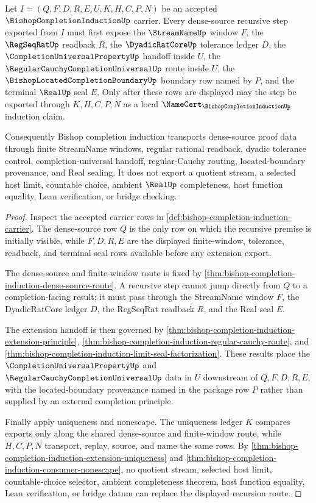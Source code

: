 \begin{theorem}
\label{thm:bishop-completion-induction-window-recursion}
Let $I=(Q,F,D,R,E,U,K,H,C,P,N)$ be an accepted $\BishopCompletionInductionUp$ carrier. Every dense-source recursive step exported from $I$ must first expose the $\StreamNameUp$ window $F$, the $\RegSeqRatUp$ readback $R$, the $\DyadicRatCoreUp$ tolerance ledger $D$, the $\CompletionUniversalPropertyUp$ handoff inside $U$, the $\RegularCauchyCompletionUniversalUp$ route inside $U$, the $\BishopLocatedCompletionBoundaryUp$ boundary row named by $P$, and the terminal $\RealUp$ seal $E$. Only after these rows are displayed may the step be exported through $K,H,C,P,N$ as a local $\NameCert_{\BishopCompletionInductionUp}$ induction claim.

Consequently Bishop completion induction transports dense-source proof data through finite StreamName windows, regular rational readback, dyadic tolerance control, completion-universal handoff, regular-Cauchy routing, located-boundary provenance, and Real sealing. It does not export a quotient stream, a selected host limit, countable choice, ambient $\RealUp$ completeness, host function equality, Lean verification, or bridge checking.
\end{theorem}
\begin{proof}
Inspect the accepted carrier rows in \autoref{def:bishop-completion-induction-carrier}. The dense-source row $Q$ is the only row on which the recursive premise is initially visible, while $F,D,R,E$ are the displayed finite-window, tolerance, readback, and terminal seal rows available before any extension export.

The dense-source and finite-window route is fixed by \autoref{thm:bishop-completion-induction-dense-source-route}. A recursive step cannot jump directly from $Q$ to a completion-facing result; it must pass through the StreamName window $F$, the DyadicRatCore ledger $D$, the RegSeqRat readback $R$, and the Real seal $E$.

The extension handoff is then governed by \autoref{thm:bishop-completion-induction-extension-principle}, \autoref{thm:bishop-completion-induction-regular-cauchy-route}, and \autoref{thm:bishop-completion-induction-limit-seal-factorization}. These results place the $\CompletionUniversalPropertyUp$ and $\RegularCauchyCompletionUniversalUp$ data in $U$ downstream of $Q,F,D,R,E$, with the located-boundary provenance named in the package row $P$ rather than supplied by an external completion principle.

Finally apply uniqueness and nonescape. The uniqueness ledger $K$ compares exports only along the shared dense-source and finite-window route, while $H,C,P,N$ transport, replay, source, and name the same rows. By \autoref{thm:bishop-completion-induction-extension-uniqueness} and \autoref{thm:bishop-completion-induction-consumer-nonescape}, no quotient stream, selected host limit, countable-choice selector, ambient completeness theorem, host function equality, Lean verification, or bridge datum can replace the displayed recursion route.
\end{proof}


